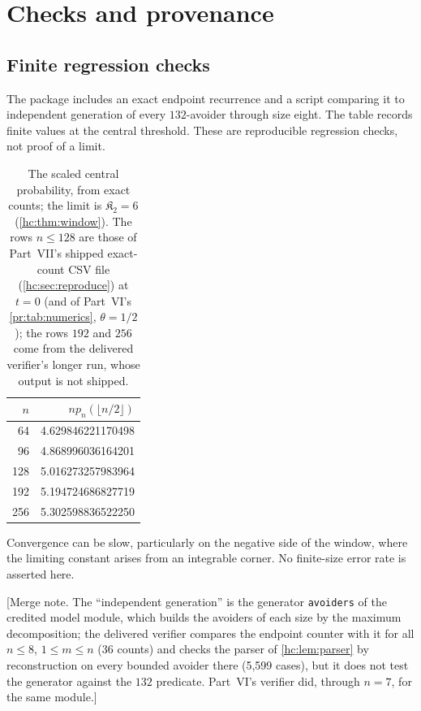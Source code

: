 \documentclass[11pt,a4paper]{article}
\theoremstyle{definition}\newaliascnt{definition}{theorem}
\theoremstyle{remark}\newaliascnt{remark}{theorem}
\begin{document}
\section{Checks and provenance}
\label{hc:sec:checks}

\subsection{Finite regression checks}
\label{hc:sec:finite}
The package includes an exact endpoint recurrence and a script comparing it
to independent generation of every $132$-avoider through size eight. The
table records finite values at the central threshold. These are
reproducible regression checks, not proof of a limit.
\begin{table}[htbp]
\centering
\begin{tabular}{rr}
\toprule
$n$ & $n p_n(\lfloor n/2\rfloor)$\\
\midrule
64&4.629846221170498\\
96&4.868996036164201\\
128&5.016273257983964\\
192&5.194724686827719\\
256&5.302598836522250\\
\bottomrule
\end{tabular}
\caption{The scaled central probability, from exact counts; the limit is
$\mathfrak K_2=6$ (\cref{hc:thm:window}). The rows $n\le128$ are those of
Part~VII's shipped exact-count CSV file (\cref{hc:sec:reproduce}) at $t=0$
(and of Part~VI's \cref{pr:tab:numerics}, $\theta=1/2$); the rows $192$ and
$256$ come from the delivered verifier's longer run, whose output is not
shipped.}\label{hc:tab:finite}
\end{table}
Convergence can be slow, particularly on the negative side of the window,
where the limiting constant arises from an integrable corner. No finite-size
error rate is asserted here.

[Merge note. The ``independent generation'' is the generator
\texttt{avoiders} of the credited model module, which builds the avoiders of
each size by the maximum decomposition; the delivered verifier compares the
endpoint counter with it for all $n\le8$, $1\le m\le n$ (36 counts) and
checks the parser of \cref{hc:lem:parser} by reconstruction on every bounded
avoider there (5,599 cases), but it does not test the generator against the
$132$ predicate. Part~VI's verifier did, through $n=7$, for the same
module.]
\end{document}
